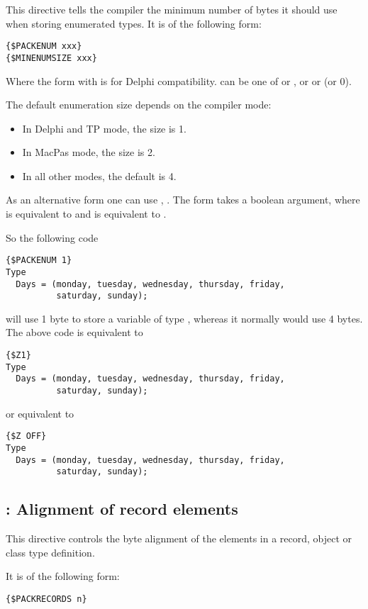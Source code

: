 This directive tells the compiler the minimum number of bytes it should
use when storing enumerated types. It is of the following form:
\begin{verbatim}
{$PACKENUM xxx}
{$MINENUMSIZE xxx}
\end{verbatim}
Where the form with  is for Delphi compatibility.
 can be one of  or , or  or
 (or 0).

The default enumeration size depends on the compiler mode:
\begin{itemize}
\item In Delphi and TP mode, the size is 1.
\item In MacPas mode, the size is 2.
\item In all other modes, the default is 4.
\end{itemize}

As an alternative form one can use , 
. The  form takes a boolean argument, 
where  is equivalent to  and  is 
equivalent to .

So the following code
\begin{verbatim}
{$PACKENUM 1}
Type
  Days = (monday, tuesday, wednesday, thursday, friday,
          saturday, sunday);
\end{verbatim}
will use 1 byte to store a variable of type , whereas it normally
would use 4 bytes. The above code is equivalent to
\begin{verbatim}
{$Z1}
Type
  Days = (monday, tuesday, wednesday, thursday, friday,
          saturday, sunday);
\end{verbatim}
or equivalent to
\begin{verbatim}
{$Z OFF}
Type
  Days = (monday, tuesday, wednesday, thursday, friday,
          saturday, sunday);
\end{verbatim}

\subsection{ : Alignment of record elements}
\label{se:Packrecords}
This directive controls the byte alignment of the elements in a record,
object or class type definition. 

It is of the following form:
\begin{verbatim}
{$PACKRECORDS n}
\end{verbatim}

